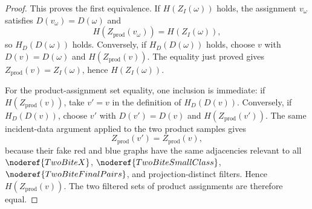 \begin{proof}
This proves the first equivalence.  If \(H(Z_I(\omega))\) holds, the
assignment \(v_\omega\) satisfies \(D(v_\omega)=D(\omega)\) and
\[
H(Z_{\mathrm{prod}}(v_\omega))=H(Z_I(\omega)),
\]
so \(H_D(D(\omega))\) holds.  Conversely, if \(H_D(D(\omega))\) holds, choose
\(v\) with \(D(v)=D(\omega)\) and \(H(Z_{\mathrm{prod}}(v))\).  The equality
just proved gives \(Z_{\mathrm{prod}}(v)=Z_I(\omega)\), hence
\(H(Z_I(\omega))\).

For the product-assignment set equality, one inclusion is immediate: if
\(H(Z_{\mathrm{prod}}(v))\), take \(v'=v\) in the definition of
\(H_D(D(v))\).  Conversely, if \(H_D(D(v))\), choose \(v'\) with
\(D(v')=D(v)\) and \(H(Z_{\mathrm{prod}}(v'))\).  The same incident-data
argument applied to the two product samples gives
\[
Z_{\mathrm{prod}}(v')=Z_{\mathrm{prod}}(v),
\]
because their fake red and blue graphs have the same adjacencies relevant to
all \(\noderef{TwoBiteX}\), \(\noderef{TwoBiteSmallClass}\),
\(\noderef{TwoBiteFinalPairs}\), and projection-distinct filters.  Hence
\(H(Z_{\mathrm{prod}}(v))\).  The two filtered sets of product assignments are
therefore equal.
\end{proof}
